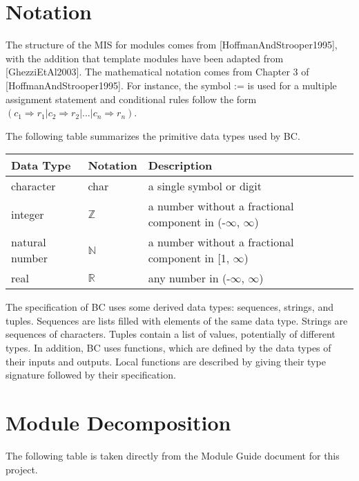 \documentclass[12pt, titlepage]{article}
\begin{document}
\section{Notation}


The structure of the MIS for modules comes from [HoffmanAndStrooper1995],
with the addition that template modules have been adapted from
[GhezziEtAl2003].  The mathematical notation comes from Chapter 3 of
[HoffmanAndStrooper1995].  For instance, the symbol := is used for a
multiple assignment statement and conditional rules follow the form $(c_1
\Rightarrow r_1 | c_2 \Rightarrow r_2 | ... | c_n \Rightarrow r_n )$.

The following table summarizes the primitive data types used by BC. 
\begin{center}
\renewcommand{\arraystretch}{1.2}
\noindent 
\begin{tabular}{l l p{7.5cm}} 
\toprule 
\textbf{Data Type} & \textbf{Notation} & \textbf{Description}\\ 
\midrule
character & char & a single symbol or digit\\
integer & $\mathbb{Z}$ & a number without a fractional component in (-$\infty$, $\infty$) \\
natural number & $\mathbb{N}$ & a number without a fractional component in [1, $\infty$) \\
real & $\mathbb{R}$ & any number in (-$\infty$, $\infty$)\\
\bottomrule
\end{tabular} 
\end{center}

\noindent
The specification of BC uses some derived data types: sequences, strings, and
tuples. Sequences are lists filled with elements of the same data type. Strings
are sequences of characters. Tuples contain a list of values, potentially of
different types. In addition, BC uses functions, which
are defined by the data types of their inputs and outputs. Local functions are
described by giving their type signature followed by their specification.

\section{Module Decomposition}

The following table is taken directly from the Module Guide document for this project.
\end{document}
